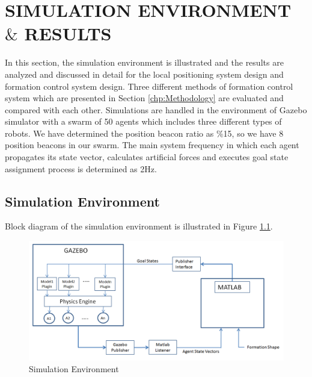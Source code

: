 

\chapter{SIMULATION ENVIRONMENT $\&$ RESULTS}
\label{chp:simulation}













In this section, the simulation environment is illustrated and the results are analyzed and discussed in detail for the local positioning system design and formation control system design. Three different methods of formation control system which are presented in Section \ref{chp:Methodology} are evaluated and compared with each other. Simulations are handled in the environment of Gazebo simulator with a swarm of 50 agents which includes three different types of robots. We have determined the position beacon ratio as $\%$15, so we have 8 position beacons in our swarm. The main system frequency in which each agent propagates its state vector, calculates artificial forces and executes goal state assignment process is determined as 2Hz. 

\newpage
\section{Simulation Environment}
Block diagram of the simulation environment is illustrated in Figure \ref{simulation_env_ref}.

\begin{figure}[H]
\caption{Simulation Environment} \label{simulation_env_ref}
\centering
\includegraphics[scale = 0.45]{environment}
\end{figure}
    
